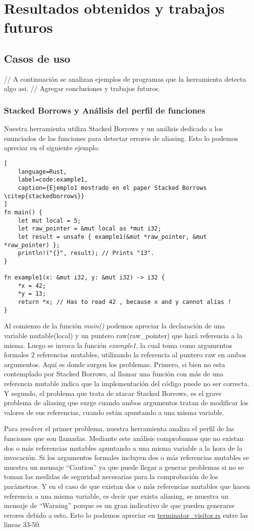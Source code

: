 \chapter{Resultados obtenidos y trabajos futuros}
\section{Casos de uso}
// A continuación se analizan ejemplos de programas que la herramienta detecta algo asi.
// Agregar conclusiones y trabajos futuros.
\subsection{Stacked Borrows y Análisis del perfil de funciones}
Nuestra herramienta utiliza Stacked Borrows y un análisis dedicado a los enunciados de las funciones para detectar errores de aliasing. Esto lo podemos apreciar en el siguiente ejemplo.

\begin{lstlisting}[
    language=Rust,
    label=code:example1,
    caption={Ejemplo1 mostrado en el paper Stacked Borrows \citep{stackedborrows}}
]
fn main() {
    let mut local = 5;
    let raw_pointer = &mut local as *mut i32;
    let result = unsafe { example1(&mut *raw_pointer, &mut *raw_pointer) };
    println!("{}", result); // Prints "13".
}

fn example1(x: &mut i32, y: &mut i32) -> i32 {
    *x = 42;
    *y = 13;
    return *x; // Has to read 42 , because x and y cannot alias !
}
\end{lstlisting}

Al comienzo de la función \textit{main()} podemos apreciar la declaración de una variable mutable(local) y un puntero raw(raw\_pointer) que hará referencia a la misma. Luego se invoca la función \textit{example1}, la cual toma como argumentos formales 2 referencias mutables, utilizando la referencia al puntero raw en ambos argumentos. Aquí es donde surgen los problemas. Primero, si bien no esta contemplado por Stacked Borrows, al llamar una función con más de una referencia mutable indica que la implementación del código puede no ser correcta. Y segundo, el problema que trata de atacar Stacked Borrows, es el grave problema de aliasing que surge cuando ambos argumentos tratan de modificar los valores de sus referencias, cuando están apuntando a una misma variable.

Para resolver el primer problema, nuestra herramienta analiza el perfil de las funciones que son llamadas. Mediante este análisis comprobamos que no existan dos o más referencias mutables apuntando a una misma variable a la hora de la invocación. Si los argumentos formales incluyen dos o más referencias mutables se muestra un mensaje ``Caution'' ya que puede llegar a generar problemas si no se toman las medidas de seguridad necesarias para la comprobación de los parámetros. Y en el caso de que existan dos o más referencias mutables que hacen referencia a una misma variable, es decir que exista aliasing, se muestra un mensaje de ``Warning'' porque es un gran indicativo de que pueden generarse errores debido a esto. Esto lo podemos apreciar en \href{run:../src/mir_visitor/terminator_visitor.rs}{terminator\_visitor.rs} entre las lineas 33-50.

